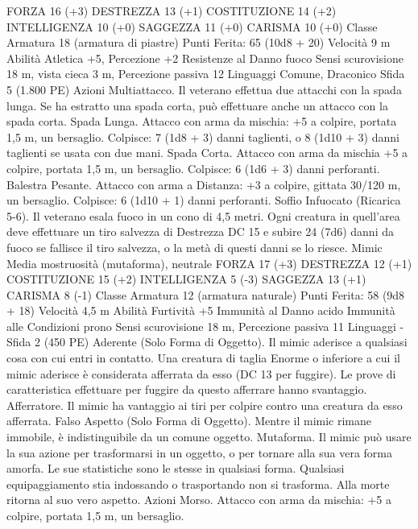\begin{multicols}{2}
FORZA 16 (+3)
DESTREZZA 13 (+1)
COSTITUZIONE 14 (+2)
INTELLIGENZA 10 (+0)
SAGGEZZA 11 (+0)
CARISMA 10 (+0)
Classe Armatura 18 (armatura di piastre)
\hspace*{0pt}\hfill{Punti Ferita}: 65 (10d8 + 20)
Velocità 9 m
Abilità Atletica +5, Percezione +2
Resistenze al Danno fuoco
Sensi scurovisione 18 m, vista cieca 3 m, Percezione passiva 12
Linguaggi Comune, Draconico
Sfida 5 (1.800 PE)
Azioni
Multiattacco. Il veterano effettua due attacchi con la spada
lunga. Se ha estratto una spada corta, può effettuare anche un
attacco con la spada corta.
Spada Lunga. Attacco con arma da mischia: +5 a colpire,
portata 1,5 m, un bersaglio.
Colpisce: 7 (1d8 + 3) danni taglienti, o 8 (1d10 + 3) danni
taglienti se usata con due mani.
Spada Corta. Attacco con arma da mischia +5 a colpire, portata
1,5 m, un bersaglio.
Colpisce: 6 (1d6 + 3) danni perforanti.
Balestra Pesante. Attacco con arma a Distanza: +3 a colpire,
gittata 30/120 m, un bersaglio.
Colpisce: 6 (1d10 + 1) danni perforanti.
Soffio Infuocato (Ricarica 5-6). Il veterano esala fuoco in un
cono di 4,5 metri. Ogni creatura in quell’area deve effettuare un
tiro salvezza di Destrezza DC 15 e subire 24 (7d6) danni da
fuoco se fallisce il tiro salvezza, o la metà di questi danni se lo
riesce.
Mimic
Media mostruosità (mutaforma), neutrale
FORZA 17 (+3)
DESTREZZA 12 (+1)
COSTITUZIONE 15 (+2)
INTELLIGENZA 5 (-3)
SAGGEZZA 13 (+1)
CARISMA 8 (-1)
Classe Armatura 12 (armatura naturale)
\hspace*{0pt}\hfill{Punti Ferita}: 58 (9d8 + 18)
Velocità 4,5 m
Abilità Furtività +5
Immunità al Danno acido
Immunità alle Condizioni prono
Sensi scurovisione 18 m, Percezione passiva 11
Linguaggi -
Sfida 2 (450 PE)
Aderente (Solo Forma di Oggetto). Il mimic aderisce a qualsiasi
cosa con cui entri in contatto. Una creatura di taglia Enorme o
inferiore a cui il mimic aderisce è considerata afferrata da esso
(DC 13 per fuggire). Le prove di caratteristica effettuare per
fuggire da questo afferrare hanno svantaggio.
Afferratore. Il mimic ha vantaggio ai tiri per colpire contro una
creatura da esso afferrata.
Falso Aspetto (Solo Forma di Oggetto). Mentre il mimic rimane
immobile, è indistinguibile da un comune oggetto.
Mutaforma. Il mimic può usare la sua azione per trasformarsi in
un oggetto, o per tornare alla sua vera forma amorfa. Le sue
statistiche sono le stesse in qualsiasi forma. Qualsiasi
equipaggiamento stia indossando o trasportando non si
trasforma. Alla morte ritorna al suo vero aspetto.
Azioni
Morso. Attacco con arma da mischia: +5 a colpire, portata 1,5
m, un bersaglio.

\end{multicols}
